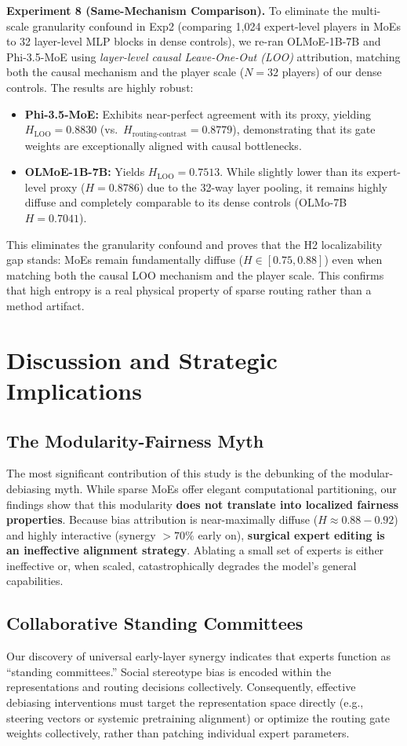\documentclass[11pt,a4paper]{article}
\begin{document}
\textbf{Experiment 8 (Same-Mechanism Comparison).} To eliminate the multi-scale granularity confound in Exp2 (comparing 1,024 expert-level players in MoEs to 32 layer-level MLP blocks in dense controls), we re-ran OLMoE-1B-7B and Phi-3.5-MoE using \textit{layer-level causal Leave-One-Out (LOO)} attribution, matching both the causal mechanism and the player scale ($N=32$ players) of our dense controls. The results are highly robust:
\begin{itemize}
    \item \textbf{Phi-3.5-MoE:} Exhibits near-perfect agreement with its proxy, yielding $H_{\text{LOO}} = 0.8830$ (vs.\ $H_{\text{routing-contrast}} = 0.8779$), demonstrating that its gate weights are exceptionally aligned with causal bottlenecks.
    \item \textbf{OLMoE-1B-7B:} Yields $H_{\text{LOO}} = 0.7513$. While slightly lower than its expert-level proxy ($H = 0.8786$) due to the 32-way layer pooling, it remains highly diffuse and completely comparable to its dense controls (OLMo-7B $H = 0.7041$).
\end{itemize}
This eliminates the granularity confound and proves that the H2 localizability gap stands: MoEs remain fundamentally diffuse ($H \in [0.75, 0.88]$) even when matching both the causal LOO mechanism and the player scale. This confirms that high entropy is a real physical property of sparse routing rather than a method artifact.

\section{Discussion and Strategic Implications}

\subsection{The Modularity-Fairness Myth}
The most significant contribution of this study is the debunking of the modular-debiasing myth. While sparse MoEs offer elegant computational partitioning, our findings show that this modularity \textbf{does not translate into localized fairness properties}. Because bias attribution is near-maximally diffuse ($H \approx 0.88 - 0.92$) and highly interactive (synergy $> 70\%$ early on), \textbf{surgical expert editing is an ineffective alignment strategy}. Ablating a small set of experts is either ineffective or, when scaled, catastrophically degrades the model's general capabilities.

\subsection{Collaborative Standing Committees}
Our discovery of universal early-layer synergy indicates that experts function as ``standing committees.'' Social stereotype bias is encoded within the representations and routing decisions collectively. Consequently, effective debiasing interventions must target the representation space directly (e.g., steering vectors or systemic pretraining alignment) or optimize the routing gate weights collectively, rather than patching individual expert parameters.
\end{document}
